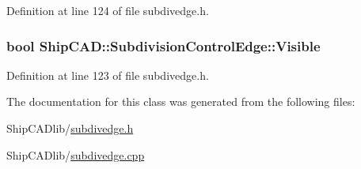 Definition at line 124 of file subdivedge.\-h.

\hypertarget{classShipCAD_1_1SubdivisionControlEdge_a8d2d3e419649962262d049bde688caac}{
\subsubsection[{Visible}]{\setlength{\rightskip}{0pt plus 5cm}bool Ship\-C\-A\-D\-::\-Subdivision\-Control\-Edge\-::\-Visible\hspace{0.3cm}{\ttfamily [read]}}}\label{classShipCAD_1_1SubdivisionControlEdge_a8d2d3e419649962262d049bde688caac}


Definition at line 123 of file subdivedge.\-h.



The documentation for this class was generated from the following files\-:\begin{DoxyCompactItemize}
\item 
Ship\-C\-A\-Dlib/\hyperlink{subdivedge_8h}{subdivedge.\-h}\item 
Ship\-C\-A\-Dlib/\hyperlink{subdivedge_8cpp}{subdivedge.\-cpp}\end{DoxyCompactItemize}
